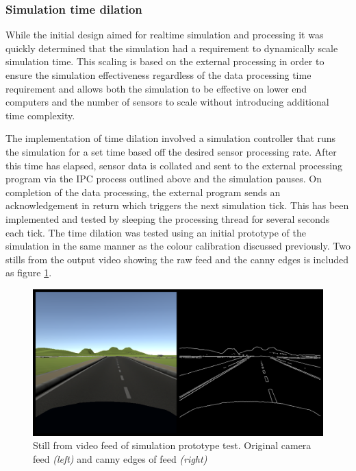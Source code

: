 \documentclass[]{aiaa-tc}%
\begin{document}
\subsubsection{Simulation time dilation}\label{sect:timedilation}

While the initial design aimed for realtime simulation and processing it was quickly determined that the simulation had a requirement to dynamically scale simulation time. This scaling is based on the external processing in order to ensure the simulation effectiveness regardless of the data processing time requirement and allows both the simulation to be effective on lower end computers and the number of sensors to scale without introducing additional time complexity.

The implementation of time dilation involved a simulation controller that runs the simulation for a set time based off the desired sensor processing rate. After this time has elapsed, sensor data is collated and sent to the external processing program via the IPC process outlined above and the simulation pauses. On completion of the data processing, the external program sends an acknowledgement in return which triggers the next simulation tick. This has been implemented and tested by sleeping the processing thread for several seconds each tick. The time dilation was tested using an initial prototype of the simulation in the same manner as the colour calibration discussed previously. Two stills from the output video showing the raw feed and the canny edges is included as figure \ref{f:simPrototypeIPCTest}.


\begin{figure}[htb]%
 \includegraphics{simPrototypeIPC.png}
 \caption{Still from video feed of simulation prototype test. Original camera feed \textit{(left)} and canny edges of feed \textit{(right)}}
 \label{f:simPrototypeIPCTest}
\end{figure}
\end{document}
